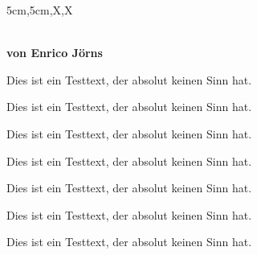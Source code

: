\documentclass[a3paper,scifiposter,style=scifi]{tubsposter}
\begin{document}
  \begin{tubsposter}{5cm,5cm,X,X}
  \begin{posterrow}
    \bfseries{}\\[1em]
    von Enrico Jörns
  \end{posterrow}
  \begin{posterrow}[X,3cm,X]
    \begin{postercol}
      Dies ist ein Testtext, der absolut keinen Sinn hat.
    \end{postercol}
    \begin{postercol}
      Dies ist ein Testtext, der absolut keinen Sinn hat.
    \end{postercol}
    \begin{postercol}
      Dies ist ein Testtext, der absolut keinen Sinn hat.
    \end{postercol}
  \end{posterrow}
  \begin{posterrow}[X,X,X]
    \begin{postercol}
      Dies ist ein Testtext, der absolut keinen Sinn hat.
    \end{postercol}
    \begin{postercol}
      Dies ist ein Testtext, der absolut keinen Sinn hat.
    \end{postercol}
    \begin{postercol}[X,X]
      \begin{postersubrow}
        Dies ist ein Testtext, der absolut keinen Sinn hat.
      \end{postersubrow}
      \begin{postersubrow}
        Dies ist ein Testtext, der absolut keinen Sinn hat.
      \end{postersubrow}
    \end{postercol}
  \end{posterrow}
\end{tubsposter}
\end{document}
